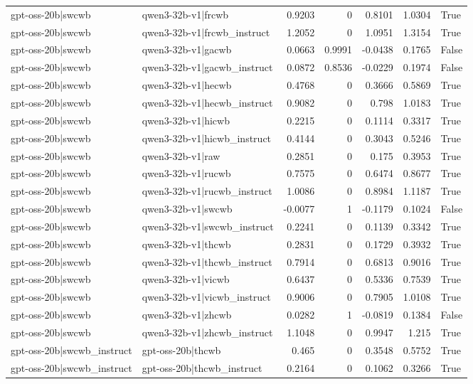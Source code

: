 \begin{table}
\begin{tabular}{l l r r r r l}
gpt-oss-20b|swcwb & qwen3-32b-v1|frcwb & 0.9203 & 0 & 0.8101 & 1.0304 & True \\
gpt-oss-20b|swcwb & qwen3-32b-v1|frcwb_instruct & 1.2052 & 0 & 1.0951 & 1.3154 & True \\
gpt-oss-20b|swcwb & qwen3-32b-v1|gacwb & 0.0663 & 0.9991 & -0.0438 & 0.1765 & False \\
gpt-oss-20b|swcwb & qwen3-32b-v1|gacwb_instruct & 0.0872 & 0.8536 & -0.0229 & 0.1974 & False \\
gpt-oss-20b|swcwb & qwen3-32b-v1|hecwb & 0.4768 & 0 & 0.3666 & 0.5869 & True \\
gpt-oss-20b|swcwb & qwen3-32b-v1|hecwb_instruct & 0.9082 & 0 & 0.798 & 1.0183 & True \\
gpt-oss-20b|swcwb & qwen3-32b-v1|hicwb & 0.2215 & 0 & 0.1114 & 0.3317 & True \\
gpt-oss-20b|swcwb & qwen3-32b-v1|hicwb_instruct & 0.4144 & 0 & 0.3043 & 0.5246 & True \\
gpt-oss-20b|swcwb & qwen3-32b-v1|raw & 0.2851 & 0 & 0.175 & 0.3953 & True \\
gpt-oss-20b|swcwb & qwen3-32b-v1|rucwb & 0.7575 & 0 & 0.6474 & 0.8677 & True \\
gpt-oss-20b|swcwb & qwen3-32b-v1|rucwb_instruct & 1.0086 & 0 & 0.8984 & 1.1187 & True \\
gpt-oss-20b|swcwb & qwen3-32b-v1|swcwb & -0.0077 & 1 & -0.1179 & 0.1024 & False \\
gpt-oss-20b|swcwb & qwen3-32b-v1|swcwb_instruct & 0.2241 & 0 & 0.1139 & 0.3342 & True \\
gpt-oss-20b|swcwb & qwen3-32b-v1|thcwb & 0.2831 & 0 & 0.1729 & 0.3932 & True \\
gpt-oss-20b|swcwb & qwen3-32b-v1|thcwb_instruct & 0.7914 & 0 & 0.6813 & 0.9016 & True \\
gpt-oss-20b|swcwb & qwen3-32b-v1|vicwb & 0.6437 & 0 & 0.5336 & 0.7539 & True \\
gpt-oss-20b|swcwb & qwen3-32b-v1|vicwb_instruct & 0.9006 & 0 & 0.7905 & 1.0108 & True \\
gpt-oss-20b|swcwb & qwen3-32b-v1|zhcwb & 0.0282 & 1 & -0.0819 & 0.1384 & False \\
gpt-oss-20b|swcwb & qwen3-32b-v1|zhcwb_instruct & 1.1048 & 0 & 0.9947 & 1.215 & True \\
gpt-oss-20b|swcwb_instruct & gpt-oss-20b|thcwb & 0.465 & 0 & 0.3548 & 0.5752 & True \\
gpt-oss-20b|swcwb_instruct & gpt-oss-20b|thcwb_instruct & 0.2164 & 0 & 0.1062 & 0.3266 & True \\

\end{tabular}
\end{table}
